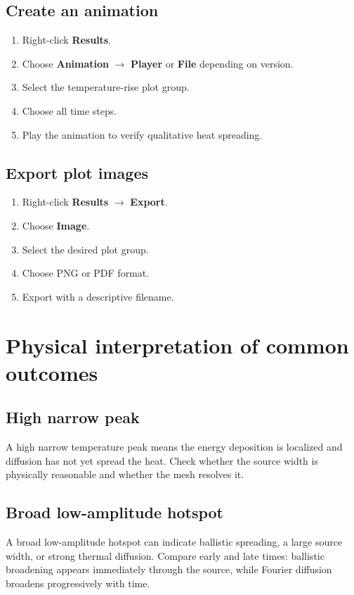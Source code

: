 \documentclass[11pt]{article}
\newcommand{\menu}[1]{\textbf{#1}}
\begin{document}
\subsection{Create an animation}
\begin{enumerate}
\item Right-click \menu{Results}.
\item Choose \menu{Animation} \(\rightarrow\) \menu{Player} or \menu{File} depending on version.
\item Select the temperature-rise plot group.
\item Choose all time steps.
\item Play the animation to verify qualitative heat spreading.
\end{enumerate}

\subsection{Export plot images}
\begin{enumerate}
\item Right-click \menu{Results} \(\rightarrow\) \menu{Export}.
\item Choose \menu{Image}.
\item Select the desired plot group.
\item Choose PNG or PDF format.
\item Export with a descriptive filename.
\end{enumerate}

\section{Physical interpretation of common outcomes}

\subsection{High narrow peak}
A high narrow temperature peak means the energy deposition is localized and diffusion has not yet spread the heat.  Check whether the source width is physically reasonable and whether the mesh resolves it.

\subsection{Broad low-amplitude hotspot}
A broad low-amplitude hotspot can indicate ballistic spreading, a large source width, or strong thermal diffusion.  Compare early and late times: ballistic broadening appears immediately through the source, while Fourier diffusion broadens progressively with time.
\end{document}
